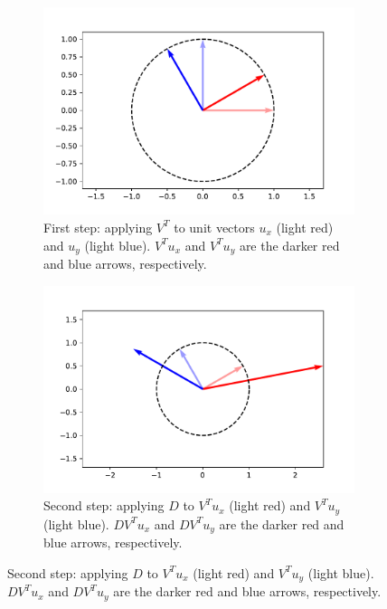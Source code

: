 \documentclass{article}
\theoremstyle{definition}
\begin{document}
\begin{figure}[ht]
    \centering 
    \begin{subfigure}[ht]{\linewidth}
        \centering
        \includegraphics[scale=0.45]{images/lin_alg/svd_v.pdf}
        \caption{First step: applying $V^T$ to unit vectors $u_x$ (light red) and $u_y$ (light blue). $V^Tu_x$ and $V^Tu_y$ are the darker red and blue arrows, respectively.}
        \label{linalg-fig:svd-v}
    \end{subfigure}%
    
    \begin{subfigure}[ht]{\linewidth}
        \centering
        \includegraphics[scale=0.45]{images/lin_alg/svd_d.pdf}
        \caption{Second step: applying $D$ to $V^Tu_x$ (light red) and $V^Tu_y$ (light blue). $DV^Tu_x$ and $DV^Tu_y$ are the darker red and blue arrows, respectively.}
        \label{linalg-fig:svd-d}
    \end{subfigure}%
    

\end{figure}
\end{document}
